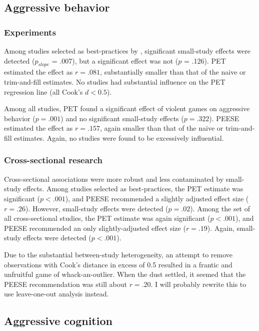 \documentclass[man]{apa6}
\begin{document}
\subsection{Aggressive behavior}
\subsubsection{Experiments}
Among studies selected as best-practices by \citet{Anderson:etal:2010}, significant small-study effects were detected ($p_{slope}$ = .007), but a significant effect was not ($p$ = .126). PET estimated the effect as $r = .081$, substantially smaller than that of the naive or trim-and-fill estimates. No studies had substantial influence on the PET regression line (all Cook's $d < 0.5$).

Among all studies, PET found a significant effect of violent games on aggressive behavior ($p = .001$) and no significant small-study effects ($p = .322$). PEESE estimated the effect as $r = .157$, again smaller than that of the naive or trim-and-fill estimates. Again, no studies were found to be excessively influential.

\subsubsection{Cross-sectional research}
Cross-sectional associations were more robust and less contaminated by small-study effects. Among studies selected as best-practices, the PET estimate was significant ($p < .001$), and PEESE recommended a slightly adjusted effect size ($r = .26$). However, small-study effects were detected ($p = .02$). Among the set of all cross-sectional studies, the PET estimate was again significant ($p < .001$), and PEESE recommended an only slightly-adjusted effect size ($r = .19$). Again, small-study effects were detected ($p < .001$).

Due to the substantial between-study heterogeneity, an attempt to remove observations with Cook's distance in excess of 0.5 resulted in a frantic and unfruitful game of whack-an-outlier. When the dust settled, it seemed that the PEESE recommendation was still about $r = .20$. I will probably rewrite this to use leave-one-out analysis instead.

\subsection{Aggressive cognition}
\end{document}
